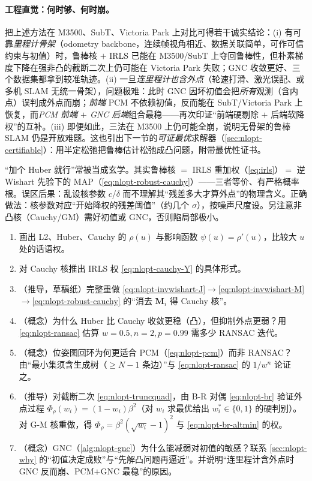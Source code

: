 \paragraph{工程直觉：何时够、何时崩。}\cite{carlone2026handbook}
把上述方法在 M3500、SubT、Victoria Park 上对比可得若干诚实结论\cite{carlone2026handbook}：(i) 有可靠\emph{里程计骨架}（odometry backbone，连续帧视角相近、数据关联简单，可作可信约束与初值）时，鲁棒核 $+$ IRLS 已能在 M3500/SubT 上夺回鲁棒性，但朴素梯度下降在强非凸的截断二次上仍可能在 Victoria Park 失败；GNC 收敛更好、三个数据集都拿到较准轨迹。(ii) 一旦\emph{连里程计也含外点}（轮速打滑、激光误配、或多机 SLAM 无统一骨架），问题极难：此时 GNC 因坏初值会把\emph{所有}观测（含内点）误判成外点而崩；\emph{前端} PCM 不依赖初值，反而能在 SubT/Victoria Park 上恢复，而\emph{PCM 前端 $+$ GNC 后端}组合最稳——再次印证“前端硬剔除 $+$ 后端软降权”的互补。(iii) 即便如此，三法在 M3500 上仍可能全崩，说明无骨架的鲁棒 SLAM 仍是开放难题。这也引出下一节的\emph{可证最优}求解器（\cref{sec:nlopt-certifiable}）：用半定松弛把鲁棒估计松弛成凸问题，附带最优性证书。

\begin{pitfall}
“加个 Huber 就行”常被当成玄学。其实鲁棒核 $=$ IRLS 重加权（\cref{eq:irls}）$=$ 逆 Wishart 先验下的 MAP（\cref{eq:nlopt-robust-cauchy}）——三者等价、有严格概率根。误区后果：乱设核参数 $c$/$\delta$ 而不理解其“残差多大才算外点”的物理含义。正确做法：核参数对应“开始降权的残差阈值”（约几个 $\sigma$），按噪声尺度设。另注意非凸核（Cauchy/GM）需好初值或 GNC，否则陷局部极小。
\end{pitfall}

\begin{practice}
\begin{enumerate}
  \item 画出 L2、Huber、Cauchy 的 $\rho(u)$ 与影响函数 $\psi(u)=\rho'(u)$，比较大 $u$ 处的话语权。
  \item 对 Cauchy 核推出 IRLS 权 \cref{eq:nlopt-cauchy-Y} 的具体形式。
  \item （推导，草稿纸）完整重做 \cref{eq:nlopt-invwishart-J}$\to$\cref{eq:nlopt-invwishart-M}$\to$\cref{eq:nlopt-robust-cauchy} 的“消去 $\mathbf{M}_i$ 得 Cauchy 核”。
  \item （概念）为什么 Huber 比 Cauchy 收敛更稳（凸），但抑制外点更弱？用 \cref{eq:nlopt-ransac} 估算 $w=0.5,n=2,p=0.99$ 需多少 RANSAC 迭代。
  \item （概念）位姿图回环为何更适合 PCM（\cref{eq:nlopt-pcm}）而非 RANSAC？由“最小集须含生成树（$\ge N-1$ 条边）”与 \cref{eq:nlopt-ransac} 的 $1/w^n$ 论证之。
  \item （推导）对截断二次 \cref{eq:nlopt-truncquad}，由 B-R 对偶 \cref{eq:nlopt-br} 验证外点过程 $\Phi_\rho(w_i)=(1-w_i)\beta^2$（对 $w_i$ 求最优给出 $w_i^*\in\{0,1\}$ 的硬判别）。对 G-M 核重做，得 $\Phi_\rho=\beta^2(\sqrt{w_i}-1)^2$ 与 \cref{eq:nlopt-br-altmin} 的权。
  \item （概念）GNC（\cref{alg:nlopt-gnc}）为什么能减弱对初值的敏感？联系 \cref{sec:nlopt-why} 的“初值决定成败”与“先解凸问题再逼近”。并说明“连里程计含外点时 GNC 反而崩、PCM$+$GNC 最稳”的原因。
\end{enumerate}
\end{practice}

